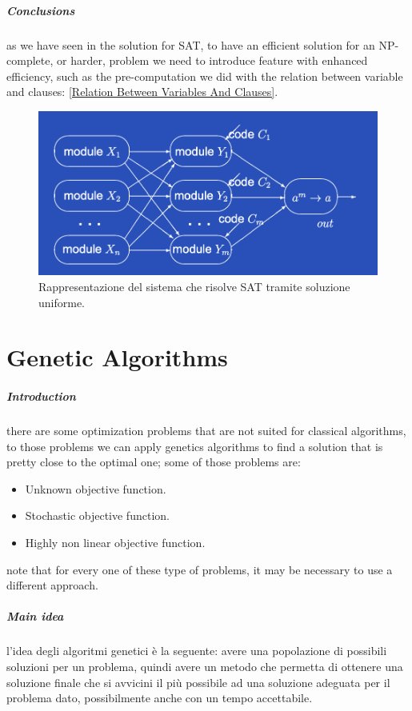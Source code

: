 \documentclass[12pt,a4paper]{report}
\begin{document}
\paragraph{Conclusions}
as we have seen in the solution for SAT, to have an efficient solution for an NP-complete, or harder, problem we need to introduce feature with enhanced efficiency, such as the pre-computation we did with the relation between variable and clauses: \ref{Relation Between Variables And Clauses}.

\begin{figure}[h]
	\centering
	\includegraphics[width=0.8\linewidth]{img/sn p sol 2}
	\caption{Rappresentazione del sistema che risolve SAT tramite soluzione uniforme.}
	\label{sn p sol 2}
\end{figure}

\chapter{Genetic Algorithms}
\paragraph{Introduction}
there are some optimization problems that are not suited for classical algorithms, to those problems we can apply genetics algorithms to find a solution that is pretty close to the optimal one; some of those problems are:
\begin{itemize}
\item Unknown objective function.
\item Stochastic objective function.
\item Highly non linear objective function.
\end{itemize}
note that for every one of these type of problems, it may be necessary to use a different approach.

\paragraph{Main idea}
l'idea degli algoritmi genetici è la seguente: avere una popolazione di possibili soluzioni per un problema, quindi avere un metodo che permetta di ottenere una soluzione finale che si avvicini il più possibile ad una soluzione adeguata per il problema dato, possibilmente anche con un tempo accettabile.
\end{document}
